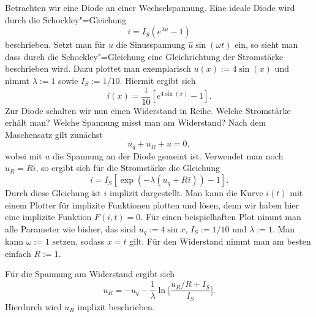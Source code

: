 \documentclass[a4paper,10pt,fleqn,twocolumn,twoside]{scrartcl}
\numberwithin{equation}{section}
\begin{document}
\noindent
Betrachten wir eine Diode an einer Wechselspannung. Eine ideale
Diode wird durch die Schockley"=Gleichung%
\begin{equation}
i=I_S(e^{\lambda u}-1)
\end{equation}
beschrieben. Setzt man für $u$ die Sinusspannung
$\hat u\sin(\omega t)$ ein, so sieht man dass durch die
Schockley"=Gleichung eine Gleichrichtung der Stromstärke
beschrieben wird. Dazu plottet man exemplarisch
$u(x):=4\sin(x)$ und nimmt $\lambda:=1$ sowie $I_S:=1/10$.
Hiermit ergibt sich%
\begin{equation}
i(x)=\frac{1}{10}[e^{4\sin(x)}-1].
\end{equation}
Zur Diode schalten wir nun einen Widerstand in Reihe.
Welche Stromstärke erhält man? Welche Spannung misst man am
Widerstand? Nach dem Maschensatz gilt zunächst%
\begin{equation}
u_q+u_R+u=0,
\end{equation}
wobei mit $u$ die Spannung an der Diode gemeint ist.
Verwendet man noch $u_R=Ri$, so ergibt sich
für die Stromstärke die Gleichung%
\begin{equation}\label{eq:impliziti}
i=I_S[\exp(-\lambda(u_q+Ri))-1].
\end{equation}
Durch diese Gleichung ist $i$ implizit dargestellt. Man kann
die Kurve $i(t)$ mit einem Plotter für implizite Funktionen
plotten und lösen, denn wir haben hier eine implizite
Funktion $F(i,t)=0$. Für einen
beispielhaften Plot nimmt man alle Parameter wie bisher, das
sind $u_q:=4\sin x$, $I_S:=1/10$ und
$\lambda:=1$. Man kann $\omega:=1$ setzen, sodass $x=t$ gilt.
Für den Widerstand nimmt man am besten einfach $R:=1$.

Für die Spannung am Widerstand ergibt sich%
\begin{equation}\label{eq:DiodeuR}
u_R = -u_q -\frac{1}{\lambda}\ln\Big[\frac{u_R/R+I_S}{I_S}\Big].
\end{equation}
Hierdurch wird $u_R$ implizit beschrieben.
\end{document}
